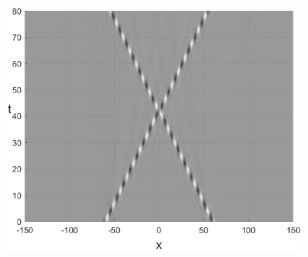 \documentclass[14pt,a4paper]{extreport}
\begin{document}
\begin{figure}[H]
\begin{minipage}[h]{0.32\linewidth}
				\end{minipage}
				\begin{minipage}[h]{0.32\linewidth}
					\includegraphics[width=1\linewidth]{fig58.eps}
				\end{minipage}


\end{figure}
\end{document}
